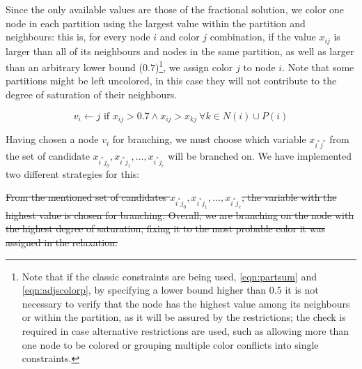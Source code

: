 Since the only available values are those of the fractional solution, we color one node in each partition using the largest value within the partition and neighbours: this is, for every node $i$ and color $j$ combination, if the value $x_{ij}$ is larger than all of its neighbours and nodes in the same partition, as well as larger than an arbitrary lower bound ($0.7$)\footnote{Note that if the classic constraints are being used, \ref{eqn:partsum} and \ref{eqn:adjscolorp}, by specifying a lower bound higher than $0.5$ it is not necessary to verify that the node has the highest value among its neighbours or within the partition, as it will be assured by the restrictions; the check is required in case alternative restrictions are used, such as allowing more than one node to be colored or grouping multiple color conflicts into single constraints.}, we assign color $j$ to node $i$. Note that some partitions might be left uncolored, in this case they will not contribute to the degree of saturation of their neighbours.

\begin{equation}
\label{eqn:fixcriteria}
v_i \leftarrow j \text{ if } x_{ij} > 0.7 \wedge x_{ij} > x_{kj}\ \forall k \in N(i) \cup P(i)
\end{equation}

\begin{nuevo}
Having chosen a node $v_i$ for branching, we must choose which variable $x_{i^*j^*}$ from the set of candidate $x_{i^*j_0}, x_{i^*j_1}, \ldots, x_{i^*j_c}$ will be branched on. We have implemented two different strategies for this:
\begin{itemize}
\end{itemize}
\end{nuevo}

\sout{
From the mentioned set of candidates $x_{i^*j_0}, x_{i^*j_1}, \ldots, x_{i^*j_c}$, the variable with the highest value is chosen for branching. Overall, we are branching on the node with the highest degree of saturation, fixing it to the most probable color it was assigned in the relaxation.
}

